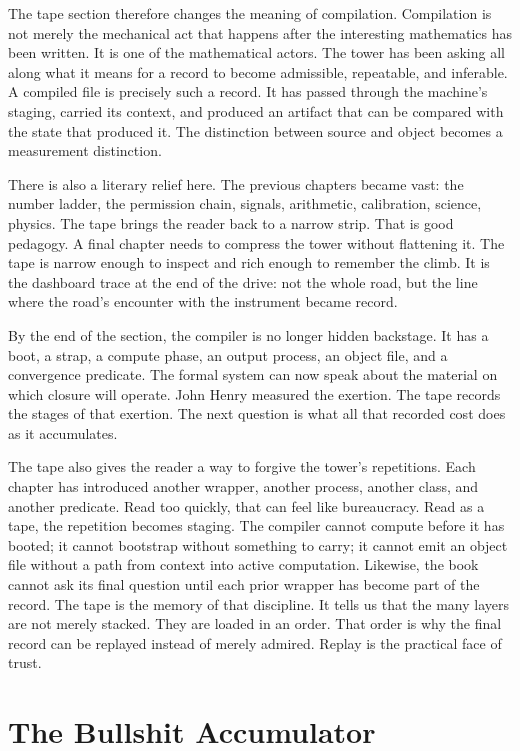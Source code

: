 The tape section therefore changes the meaning of compilation. Compilation is
not merely the mechanical act that happens after the interesting mathematics
has been written. It is one of the mathematical actors. The tower has been
asking all along what it means for a record to become admissible, repeatable,
and inferable. A compiled file is precisely such a record. It has passed
through the machine's staging, carried its context, and produced an artifact
that can be compared with the state that produced it. The distinction between
source and object becomes a measurement distinction.

There is also a literary relief here. The previous chapters became vast: the
number ladder, the permission chain, signals, arithmetic, calibration,
science, physics. The tape brings the reader back to a narrow strip. That is
good pedagogy. A final chapter needs to compress the tower without flattening
it. The tape is narrow enough to inspect and rich enough to remember the climb.
It is the dashboard trace at the end of the drive: not the whole road, but the
line where the road's encounter with the instrument became record.

By the end of the section, the compiler is no longer hidden backstage. It has
a boot, a strap, a compute phase, an output process, an object file, and a
convergence predicate. The formal system can now speak about the material on
which closure will operate. John Henry measured the exertion. The tape records
the stages of that exertion. The next question is what all that recorded cost
does as it accumulates.

The tape also gives the reader a way to forgive the tower's repetitions. Each
chapter has introduced another wrapper, another process, another class, and
another predicate. Read too quickly, that can feel like bureaucracy. Read as a
tape, the repetition becomes staging. The compiler cannot compute before it
has booted; it cannot bootstrap without something to carry; it cannot emit an
object file without a path from context into active computation. Likewise, the
book cannot ask its final question until each prior wrapper has become part of
the record. The tape is the memory of that discipline. It tells us that the
many layers are not merely stacked. They are loaded in an order.
That order is why the final record can be replayed instead of merely admired.
Replay is the practical face of trust.

\section{The Bullshit Accumulator}
\label{se:bullshit-accumulator}

